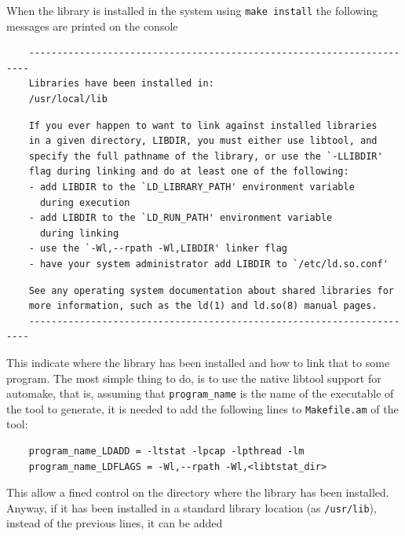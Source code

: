 \documentclass[11pt]{article}
\begin{document}
When the library is installed in the system using \texttt{make install} the
following messages are printed on the console

\begin{small}\begin{verbatim}
    ----------------------------------------------------------------------
    Libraries have been installed in:
    /usr/local/lib
\end{verbatim}\end{small} \noindent
\begin{small}\begin{verbatim}
    If you ever happen to want to link against installed libraries
    in a given directory, LIBDIR, you must either use libtool, and
    specify the full pathname of the library, or use the `-LLIBDIR'
    flag during linking and do at least one of the following:
    - add LIBDIR to the `LD_LIBRARY_PATH' environment variable
      during execution
    - add LIBDIR to the `LD_RUN_PATH' environment variable
      during linking
    - use the `-Wl,--rpath -Wl,LIBDIR' linker flag
    - have your system administrator add LIBDIR to `/etc/ld.so.conf'
\end{verbatim}\end{small} \noindent
\begin{small}\begin{verbatim}
    See any operating system documentation about shared libraries for
    more information, such as the ld(1) and ld.so(8) manual pages.
    ----------------------------------------------------------------------
\end{verbatim}\end{small} \noindent
This indicate where the library has been installed and how to
link that to some program. The most simple thing to do, is to 
use the native libtool support for automake, that is, assuming
that \texttt{program\_name} is the name of the executable of the tool
to generate, it is needed to add the following lines to \texttt{Makefile.am}
of the tool:

\begin{small}\begin{verbatim}
    program_name_LDADD = -ltstat -lpcap -lpthread -lm
    program_name_LDFLAGS = -Wl,--rpath -Wl,<libtstat_dir>
\end{verbatim}\end{small} \noindent
This allow a fined control on the directory where the library 
has been installed. Anyway, if it has been installed in a
standard library location (as \texttt{/usr/lib}), instead of the previous
lines, it can be added
\end{document}

